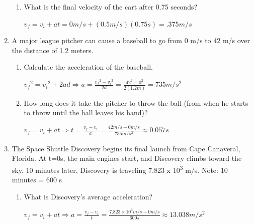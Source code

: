 \documentclass[letterpaper, 12pt]{article}
\begin{document}
\begin{enumerate}
\begin{enumerate}
		
		\item What is the final velocity of the cart after 0.75 seconds?
			\vspace{0.2in}
			\color{red}
			\begin{center}
				$v_f=v_i+at = 0 m/s + (0.5 m/s)(0.75s) =  .375 m/s  $
				\vspace{0.2in}
			\end{center}
			\color{black}
				
	\end{enumerate}
	\item A major league pitcher can cause a baseball to go from 0 m/s to 42 m/s over the distance of 1.2 meters.  
	\begin{enumerate}
		\item Calculate the acceleration of the baseball.
			\vspace{0.2in}
			\color{red}
			\begin{center}
				$ {v_f}^2 = {v_i}^2 + 2 a d \Longrightarrow a = \frac{{v_f}^2 - {v_i}^2}{2d}  =  \frac{{42}^2 - {0}^2}{2 (1.2m) } = 735 m/s^2 $
				\vspace{0.2in}
			\end{center}
			\color{black}
			
		
		
		\item How long does it take the pitcher to throw the ball (from when he starts to throw until the ball leaves his hand)?
						\vspace{0.2in}
			\color{red}
			\begin{center}
				$ v_f = v_i + a t \Longrightarrow t = \frac{v_f - v_i}{a} = \frac{42 m/s - 0 m/s} {735 m/s^2} \approx 0.057 s   $
				\vspace{0.2in}
			\end{center}
			\color{black}		
		
		
	\end{enumerate}




	\item The Space Shuttle Discovery begins its final launch from Cape Canaveral, Florida.  At t=0s, the main engines start, and Discovery climbs toward the sky.  10 minutes later, Discovery is traveling 7.823 x 10\textsuperscript{3} m/s. 	\color{red} Note: 10 minutes = 600 s \color{black}
	\begin{enumerate}
		\item What is Discovery's average acceleration?

		\vspace{0.2in}
		\color{red}
		\begin{center}
			$ v_f = v_i + a t \Longrightarrow a = \frac{v_f - v_i}{t} = \frac{7.823\times 10^3  m/s - 0 m/s} {600 s} \approx  13.038 m/s^2  $
			\vspace{0.2in}
		\end{center}
		\color{black}		



\end{enumerate}
\end{enumerate}
\end{document}
